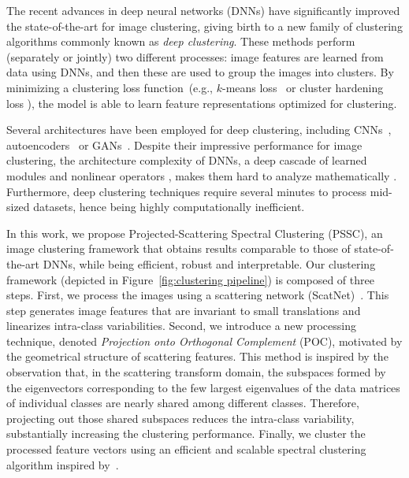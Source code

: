 \documentclass[11pt]{article}
\theoremstyle{definition}
\newcommand{\Figure}[1]{Figure~\ref{#1}}
\begin{document}
The recent advances in deep neural networks (DNNs) \cite{Lecun_CNNsVision_2010, Krizhevsky_Alexnet_2012, Zisserman_VGG_2014, He_DeepResidualLearningResNet_2016} have significantly improved the state-of-the-art for image clustering, giving birth to a new family of clustering algorithms commonly known as \textit{deep clustering}. These methods perform (separately or jointly) two different processes: image features are learned from data using DNNs, and then these are used to group the images into clusters. By minimizing a clustering loss function~(e.g., $k$-means loss~\cite{Yang_TowrdsKMeansFriendlySpacesDeepClustering_2017} or cluster hardening loss \cite{Xie_UnsupervisedDeepEmbeddingClustering_2016}), the model is able to learn feature representations optimized for clustering.

Several architectures have been employed for deep clustering, including CNNs~\cite{Caron_DeepClusteringUnsupervisedLearningVisualFeatures_2018, Yang_JointUnsupervisedLearningImageClusters_2016joint}, autoencoders~\cite{Mcconville_DeepClusteringManifoldAutoencodedEmbedding_2019, Guo_DeepClusteringConvolutionalAutoencoders_2017, Ren_DeepDensityBasedClustering_2020, Yang_TowrdsKMeansFriendlySpacesDeepClustering_2017} or GANs~\cite{Donahue_AdversarialFeatureLearning_2016, Mrabah_AdversarialDeepEmbeddedClustering_2020}. Despite their impressive performance for image clustering, the architecture complexity of DNNs, a deep cascade of learned modules and nonlinear operators \cite{Lecun_CNNsVision_2010}, makes them hard to analyze mathematically \cite{Szegedy_IntriguingPropertiesNeuralNetworks_2013, Mallat_UnderstandingDeepNetworks_2016, Zhang_RethinkingGeneralization_2016}. Furthermore, deep clustering techniques require several minutes to process mid-sized datasets, hence being highly computationally inefficient.

In this work, we propose Projected-Scattering Spectral Clustering (PSSC), an image clustering framework that obtains results comparable to those of state-of-the-art DNNs, while being efficient, robust and interpretable. Our clustering framework (depicted in \Figure{fig:clustering pipeline}) is composed of three steps. First, we process the images using a scattering network (ScatNet)~\cite{Bruna_InvariantScattering_2012}. This step generates image features that are invariant to small translations and linearizes intra-class variabilities. Second, we introduce a new processing technique, denoted \textit{Projection onto Orthogonal Complement} (POC), motivated by the geometrical structure of scattering features.
This method is inspired by the observation that, in the scattering transform domain, the subspaces formed by the eigenvectors corresponding to the few largest eigenvalues  of the data matrices of individual classes are nearly shared among different classes. 
Therefore, projecting out those shared subspaces reduces the intra-class variability, substantially increasing the clustering performance.
Finally, we cluster the processed feature vectors using an efficient and scalable spectral clustering algorithm inspired by~\cite{Huang_UltraScalableSpectralClustering_2019}.  
\end{document}
